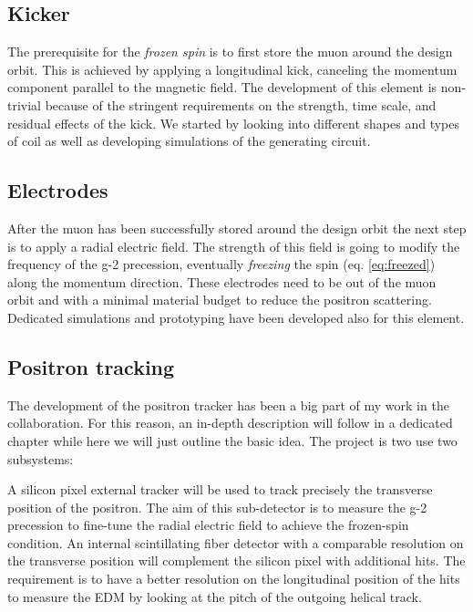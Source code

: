 \begin{refsection}
\subsection{Kicker}
The prerequisite for the \textit{frozen spin} is to first store the muon around the design orbit.
This is achieved by applying a longitudinal kick, canceling the momentum component parallel to the magnetic field.
The development of this element is non-trivial because of the stringent requirements on the strength, time scale, and residual effects of the kick.
We started by looking into different shapes and types of coil as well as developing \ltsp simulations of the generating circuit.

\subsection{Electrodes}
After the muon has been successfully stored around the design orbit the next step is to apply a radial electric field. 
The strength of this field is going to modify the frequency of the g-2 precession, eventually \textit{freezing} the spin (eq. \ref{eq:freezed}) along the momentum direction.
These electrodes need to be out of the muon orbit and with a minimal material budget to reduce the positron scattering.  
Dedicated simulations and prototyping have been developed also for this element.

\subsection{Positron tracking}
The development of the positron tracker has been a big part of my work in the collaboration.
For this reason, an in-depth description will follow in a dedicated chapter while here we will just outline the basic idea.
The project is two use two subsystems:
\begin{outline}
    \1 A silicon pixel external tracker will be used to track precisely the transverse position of the positron. The aim of this sub-detector is to measure the g-2 precession to fine-tune the radial electric field to achieve the frozen-spin condition.
    \1 An internal scintillating fiber detector with a comparable resolution on the transverse position will complement the silicon pixel with additional hits. The requirement is to have a better resolution on the longitudinal position of the hits to measure the EDM by looking at the pitch of the outgoing helical track.
\end{outline}


\end{refsection}
